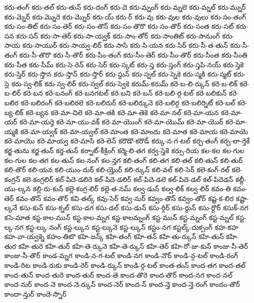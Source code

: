 {కరు-తంగ్
కరు-తల్
కరు-తున్
కరు-దంగ్
కరు-దె
కరు-మ్నంగ్
కరు-మ్నలె
కరు-మ్నల్
కరు-మ్నుర్
కరు-మ్నెర్
కరు-మ్నొరె
కరు-మ్నొర్
కరు-య్
కరు-ర్
కరు-వు
కరు-వుల
కరు-వులు
కరు-సం-తంగ్
కరు-సం-తిట్
కరు-సం-తెర్
కరు-సం-తొన్
కరు-సం-తొరొ
కరు-సం-తొర్
కరు-సంత
కరు-సట్
కరు-సన
కరు-సన్
కరు-సా-తెర్
కరు-సా-య్వక్
కరు-సాం-తోర్
కరు-సాంతిట్
కరు-సానుంగ్
కరు-సాయ
కరు-సాయుర్
కరు-సాయ్వ-లిర్
కరు-సాసి
కరు-సి-యన
కరు-సిర్
కరు-సీ-త-తున్
కరు-సీ-తంగ్
కరు-సీ-తొరొ
కరు-సీ-తొర్
కరు-సీం-తంగ్
కరు-సీం-తెర్
కరు-సీం-తొర్
కరు-సీంత
కరు-సీంతి
కరు-సీత
కరు-సీమ్
కరు-సె-రెన్
కరు-సెర్
కరు-స్కట్
కరు-స్త
కరు-స్తంగ్
కరు-స్తపి-నయ్
కరు-స్తెకె
కరు-స్తెర్
కరు-స్తొన
కరు-స్తొన్
కరు-స్తొర్
కరు-స్దున్
కరు-స్నల్
కరు-స్నెకె
కరు-స్మకి
కరు-స్మట్
కరు-స్లె
కరు-స్వ-లిక్
కరు-స్వ-లిర్
కరు-స్వల్
కరు-స్వెకె
కరుమ్-కరుమ్
కరె-బ-లి-ర్కున్
కరె-బ-లిక్
కరె-బ-లిర్
కరె-బన
కరె-బనంగ్
కరె-బనగటల్
కరె-బని
కరె-బన్
కరె-బలి-ర్గ-టల్
కరె-బలికున్
కరె-బలిర
కరె-బలిరంగ్
కరె-బలిరలె
కరె-బలిరుర్
కరె-బలిర్కునె
కరె-బలిర్గ
కరె-బలిర్నిట్
కరె-బల్
కరె-బ్య-లిక్
కరె-బ్యన
కరె-మా-చిలె
కరె-మా-తకి
కరె-మా-తెకె
కరె-మా-నల్
కరె-మా-యన
కరె-మా-యర్
కరె-మా-యర్తె
కరె-మా-యు-వక్
కరె-మా-యొంగ్
కరె-మా-యొమ్
కరె-మా-యొర్
కరె-మా-య్మకి
కరె-మా-య్వక్
కరె-మా-య్వల్
కరె-మాంత
కరె-మాందు
కరె-మాత
కరె-మాయ
కరె-మాయె
కరె-మాయొ
కరె-మాయ్వ
కరె-మాసి
కరె-లెన్
కరొడొ-కరొడ్
కర్కు-న-గ-టల్
కర్చ-తంగ్
కర్చ-లా-గ్తెకే
కర్జ-తును
కర్జ-తున్
కర్త-తున్
కర్నాట్-కీక్రింగ్
కర్మె-లి-తగ
కర్వ-స్తెకె
కర్సు-రియ
కల-కల
కల-గుల
కల-గుల
కల-తగ
కల-తున్
కల-నంగ్
కల-న్తగ
కలి-తంగ్
కలి-తగ
కలి-తల్
కలి-తున్
కలి-తుర్
కలి-తొర్
కలి-యన
కలి-యుం-దుర్
కలి-య్తొర్
కలి-ర్కున్
కలి-వల్
కలి-సెర్
కలె-కంగ్-రల్
కలె-కంగ్రన్
కలె-కంగ్రలిర్
కల్-పిదె-డలిరె
కల్-పిదె-డలిర్
కల్-పిదె-డలె
కల్-పిదె-డల్
కల్-పిదెడన్
కల్దీ-యు-ల్కన
కల్లి-రు-కున్
కల్లె-కంగ్ర-లిర్
కల్లె-త-నమ్
కల్వ-డున్
కల్వ-లిక్
కల్వ-లిర్
కవం-తి
కవం-తెర్
కవం-తొన్
కవం-తొర్
కవి-తల్క్
కవు-సెర్
కవ్వ-నుర్
కవ్వం-తొన్
కవ్వం-తోర్
కష్ట-క-లిర
కష్టా-ల్కనే
కసు-కున్
కసు-క్నల్
కసు-డగ
కసు-డల్
కసు-డున్
కసు-ర్గిర్
కసు-ర్దున్
కసు-ర్దొర్
కసుక్-నగ
కసె-మాత
కస్ట-కాల-మున్
కస్ట-కాల-మ్నగ
కస్ట-కాలమ్నంగ్
కస్ట-మున్
కస్ట-మ్నంగ్
కస్ట-మ్నల్
కస్ట-ల్క-నగ
కస్ట-ల్కు-నంగ్
కస్ట-ల్కున
కస్ట-ల్కునె
కస్ట-ల్కున్
కస్టం-నగ
కస్టల్క్-దుక్సంగ్
కహ-కహ
కహ-వా-య్వక్నె
కహం-తిటొ
కహి-జన్క్
కహి-తంగ్
కహి-తన్
కహి-తు-ర్కున్
కహి-తున్
కహి-తుర
కహి-తురె
కహి-తుర్
కహి-తె-ర్కునె
కహి-తె-ర్కున్
కహి-తెర్
కహి-రో-జు-కున్
కాంజు-సీ-తెర్
కాంజు-సీ-తొర్
కాండ-మ్నగ
కాండి-న-గ-టల్
కాండి-నగ
కాండి-నొర్
కాండి-న్గ-టల్
కాండి-రంగ్
కాండి-రిట
కాండి-రుకు
కాండి-రెర్
కాండి-ర్కున్
కాండి-ర్గ-టల్
కాంత-తున్
కాంద-తగ
కాంద-తల్
కాంద-తున్
కాంద-తురె
కాంద-తుర్
కాంద-తె
కాంద-తొరె
కాంద-తొర్
కాంద-నగ
కాంద-నల్
కాంద-నుర్
కాంద-నె
కాంద-నె-ర్కున్
కాంద-నెర్
కాంద-న్
కాంద-న్తె
కాంద-న్తె-రంగ్
కాందం-తొర్
కాందా-న్తుర్
కాందె-స్నొర్
}
